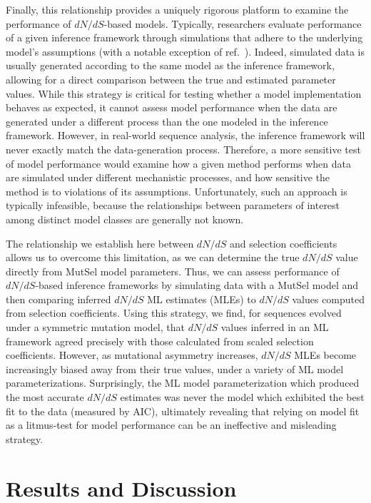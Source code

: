 \documentclass{pnastwo}
\begin{document}
\begin{article}
Finally, this relationship provides a uniquely rigorous platform to examine the performance of $dN/dS$-based models. Typically, researchers evaluate performance of a given inference framework through simulations that adhere to the underlying model's assumptions (with a notable exception of ref.\ \cite{Holder2008}). Indeed, simulated data is usually generated according to the same model as the inference framework, allowing for a direct comparison between the true and estimated parameter values. While this strategy is critical for testing whether a model implementation behaves as expected, it cannot assess model performance when the data are generated under a different process than the one modeled in the inference framework. However, in real-world sequence analysis, the inference framework will never exactly match the data-generation process. Therefore, a more sensitive test of model performance would examine how a given method performs when data are simulated under different mechanistic processes, and how sensitive the method is to violations of its assumptions. Unfortunately, such an approach is typically infeasible, because the relationships between parameters of interest among distinct model classes are generally not known.

The relationship we establish here between $dN/dS$ and selection coefficients allows us to overcome this limitation, as we can determine the true $dN/dS$ value directly from MutSel model parameters. Thus, we can assess performance of $dN/dS$-based inference frameworks by simulating data with a MutSel model and then comparing inferred $dN/dS$ ML estimates (MLEs) to $dN/dS$ values computed from selection coefficients. Using this strategy, we find, for sequences evolved under a symmetric mutation model, that $dN/dS$ values inferred in an ML framework agreed precisely with those calculated from scaled selection coefficients. However, as mutational asymmetry increases, $dN/dS$ MLEs become increasingly biased away from their true values, under a variety of ML model parameterizations. Surprisingly, the ML model parameterization which produced the most accurate $dN/dS$ estimates was never the model which exhibited the best fit to the data (measured by AIC), ultimately revealing that relying on model fit as a litmus-test for model performance can be an ineffective and misleading strategy. 

		
\section*{Results and Discussion}
		

\end{article}
\end{document}
